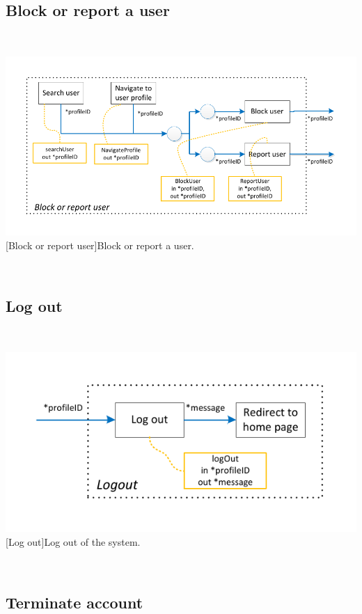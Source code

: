 \documentclass[11pt, a4paper,svglistings,oneside]{book}
\begin{document}
\subsection{Block or report a user}

$\;$ \\
\noindent\begin{minipage}{\textwidth}
    \centering
   \includegraphics[scale=1]{nav_BlockReport.pdf}
 [Block or report user]{Block or report a user.}
\end{minipage}
$\;$ \\ 

\subsection{Log out}

$\;$ \\
\noindent\begin{minipage}{\textwidth}
    \centering
   \includegraphics[scale=1]{nav_LogOff.pdf}
 [Log out]{Log out of the system.}
\end{minipage}
$\;$ \\ 

\subsection{Terminate account}
\end{document}

